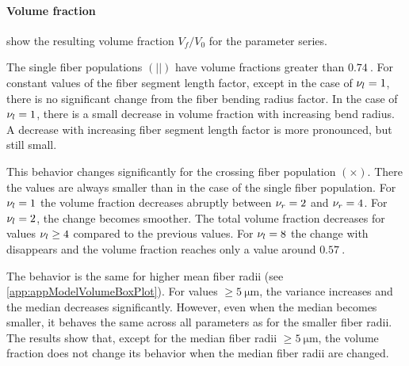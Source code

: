 \paragraph{Volume fraction}
%
 show the resulting volume fraction $V_f/V_0$ for the parameter series.
\par
%
The single fiber populations $(||)$ have volume fractions greater than $\SI{0.74}{}$.
For constant values of the fiber segment length factor, except in the case of $\textnormal{$\nu_{l}$} = \SI{1}{}$, there is no significant change from the fiber bending radius factor.
In the case of $\textnormal{$\nu_{l}$} = \SI{1}{}$, there is a small decrease in volume fraction with increasing bend radius.
A decrease with increasing fiber segment length factor \segLengthFactor{} is more pronounced, but still small.
\par
%
This behavior changes significantly for the crossing fiber population $(\times)$.
There the values are always smaller than in the case of the single fiber population.
For $\textnormal{$\nu_{l}$}{}=\SI{1}{}$ the volume fraction decreases abruptly between $\textnormal{$\nu_{r}$}{} = \SI{2}{}$ and $\textnormal{$\nu_{r}$}{} = \SI{4}{}$.
For $\textnormal{$\nu_{l}$}{}=\SI{2}{}$, the change becomes smoother.
The total volume fraction decreases for values $\textnormal{$\nu_{l}$}{} \geq \SI{4}{}$ compared to the previous values.
For $\textnormal{$\nu_{l}$}{}=\SI{8}{}$ the change with \segRadiusFactor{} disappears and the volume fraction reaches only a value around $\SI{0.57}{}$.
\par
%
The behavior is the same for higher mean fiber radii (see \cref{app:appModelVolumeBoxPlot}). For values $\geq \SI{5}{\micro\meter}$, the variance increases and the median decreases significantly.
However, even when the median becomes smaller, it behaves the same across all parameters as for the smaller fiber radii.
The results show that, except for the median fiber radii $\geq \SI{5}{\micro\meter}$, the volume fraction does not change its behavior when the median fiber radii are changed.
\par
%
%
%

